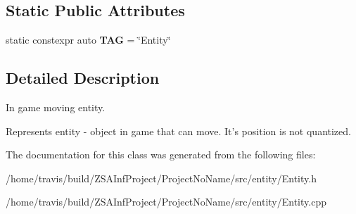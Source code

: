 \subsection*{Static Public Attributes}
\begin{DoxyCompactItemize}
\item 
\hypertarget{classEntity_a71274935a057ccb8119a625d1bff7ac4}{static constexpr auto {\bfseries T\-A\-G} = \char`\"{}Entity\char`\"{}}\label{classEntity_a71274935a057ccb8119a625d1bff7ac4}

\end{DoxyCompactItemize}


\subsection{Detailed Description}
In game moving entity. 

Represents entity -\/ object in game that can move. It's position is not quantized. 

The documentation for this class was generated from the following files\-:\begin{DoxyCompactItemize}
\item 
/home/travis/build/\-Z\-S\-A\-Inf\-Project/\-Project\-No\-Name/src/entity/Entity.\-h\item 
/home/travis/build/\-Z\-S\-A\-Inf\-Project/\-Project\-No\-Name/src/entity/Entity.\-cpp\end{DoxyCompactItemize}
